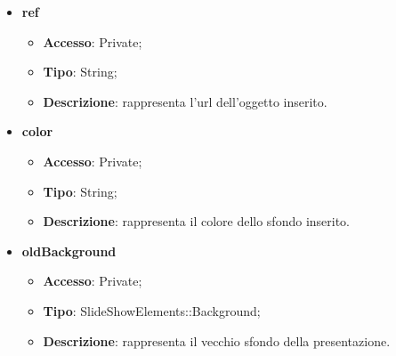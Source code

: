 {{{\begin{itemize}
		\item \textbf{ref}
		\begin{itemize}
			\item \textbf{Accesso}: Private;
			\item \textbf{Tipo}: String;
			\item \textbf{Descrizione}: rappresenta l’url dell’oggetto inserito.
		\end{itemize}
		\item \textbf{color}
		\begin{itemize}
			\item \textbf{Accesso}: Private;
			\item \textbf{Tipo}: String;
			\item \textbf{Descrizione}: rappresenta il colore dello sfondo inserito.
		\end{itemize}
		\item \textbf{oldBackground}
		\begin{itemize}
			\item \textbf{Accesso}: Private;
			\item \textbf{Tipo}: SlideShowElements::Background;
			\item \textbf{Descrizione}: rappresenta il vecchio sfondo della presentazione.
		\end{itemize}
	\end{itemize}
	
}}}
